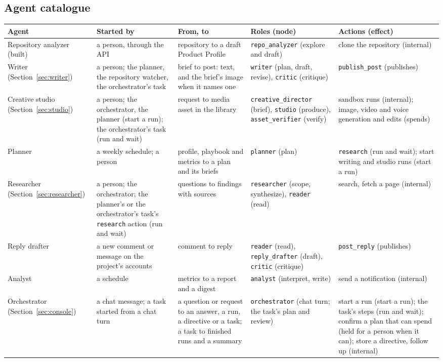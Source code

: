 \documentclass[11pt,a4paper]{article}
\begin{document}
\subsection{Agent catalogue}\label{sec:agents}
\begin{longtable}{@{}>{\raggedright\arraybackslash}p{2.5cm}>{\raggedright\arraybackslash}p{2.6cm}>{\raggedright\arraybackslash}p{2.6cm}>{\raggedright\arraybackslash}p{3.6cm}>{\raggedright\arraybackslash}p{3.6cm}@{}}
\toprule
\textbf{Agent} & \textbf{Started by} & \textbf{From, to} & \textbf{Roles (node)} & \textbf{Actions (effect)}\\
\midrule
\endhead
Repository analyzer (built) & a person, through the API & repository to a draft Product Profile & \texttt{repo\_analyzer} (explore and draft) & clone the repository (internal)\\
Writer (Section~\ref{sec:writer}) & a person; the planner, the repository watcher, the orchestrator's task & brief to post: text, and the brief's image when it names one & \texttt{writer} (plan, draft, revise), \texttt{critic} (critique) & \texttt{publish\_post} (publishes)\\
Creative studio (Section~\ref{sec:studio}) & a person; the orchestrator, the planner (start a run); the orchestrator's task (run and wait) & request to media asset in the library & \texttt{creative\_director} (brief), \texttt{studio} (produce), \texttt{asset\_verifier} (verify) & sandbox runs (internal); image, video and voice generation and edits (spends)\\
Planner & a weekly schedule; a person & profile, playbook and metrics to a plan and its briefs & \texttt{planner} (plan) & \texttt{research} (run and wait); start writing and studio runs (start a run)\\
Researcher (Section~\ref{sec:researcher}) & a person; the orchestrator; the planner's or the orchestrator's task's \texttt{research} action (run and wait) & questions to findings with sources & \texttt{researcher} (scope, synthesize), \texttt{reader} (read) & search, fetch a page (internal)\\
Reply drafter & a new comment or message on the project's accounts & comment to reply & \texttt{reader} (read), \texttt{reply\_drafter} (draft), \texttt{critic} (critique) & \texttt{post\_reply} (publishes)\\
Analyst & a schedule & metrics to a report and a digest & \texttt{analyst} (interpret, write) & send a notification (internal)\\
Orchestrator (Section~\ref{sec:console}) & a chat message; a task started from a chat turn & a question or request to an answer, a run, a directive or a task; a task to finished runs and a summary & \texttt{orchestrator} (chat turn; the task's plan and review) & start a run (start a run); the task's steps (run and wait); confirm a plan that can spend (held for a person when it can); store a directive, follow up (internal)\\
\bottomrule
\end{longtable}
\end{document}
